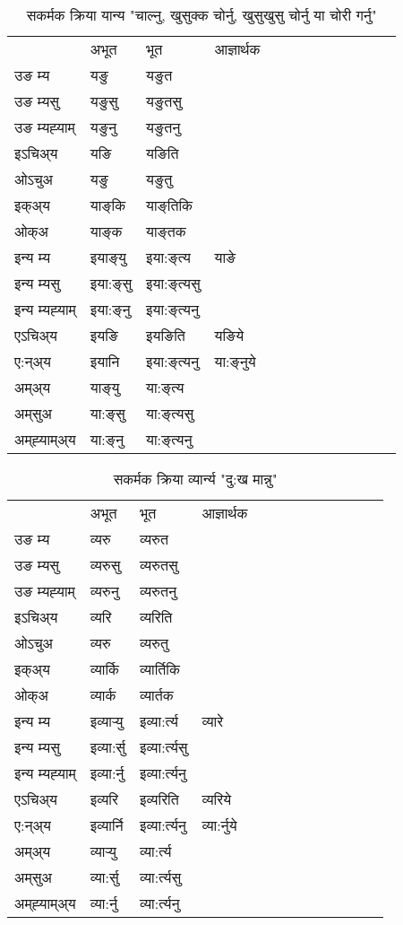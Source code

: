 \begin{table}[H]
\centering
\caption{\label{aŋ.vt} सकर्मक क्रिया  यान्य  "चाल्नु, खुसुक्क चोर्नु, खुसुखुसु चोर्नु या चोरी गर्नु"  }
\begin{tabular}{l|l|l|l|l|l|l|l|l|l|l|l|l}  \toprule
&अभूत & भूत & आज्ञार्थक \\ 
उङ म्य &यङु &यङुत \\ 
उङ म्यसु &यङुसु &यङुतसु \\ 
उङ म्यह्‍याम् &यङुनु &यङुतनु \\ 
इऽचिअ्य  &यङि &यङिति   \\ 
ओऽचुअ &यङु &यङुतु   \\ 
इक्अ्य &याङ्‌कि &याङ्‌तिकि   \\ 
ओक्अ &याङ्‌क &याङ्‌तक   \\ 
इन्य म्य& इयाङ्‌यु  & इया:ङ्‌त्य &याङे  \\ 
इन्य म्यसु & इया:ङ्‌सु  & इया:ङ्‌त्यसु   \\ 
इन्य म्यह्‍याम् & इया:ङ्‌नु  & इया:ङ्‌त्यनु   \\ 
एऽचिअ्य & इयङि & इयङिति &यङिये    \\ 
ए:न्अ्य & इयानि  & इया:ङ्‌त्यनु &या:ङ्‌नुये  \\ 
अम्अ्य & याङ्‌यु  & या:ङ्‌त्य  \\ 
अम्‌सुअ & या:ङ्‌सु & या:ङ्‌त्यसु  \\ 
अम्‌ह्‍याम्अ्य & या:ङ्‌नु  & या:ङ्‌त्यनु \\ 
\bottomrule
\end{tabular}
\end{table}


\begin{table}[H]
\centering
\caption{\label{ɛr.vt} सकर्मक क्रिया  व्यार्न्य  "दु:ख मान्नु"  }
\begin{tabular}{l|l|l|l|l|l|l|l|l|l|l|l|l}  \toprule
&अभूत & भूत & आज्ञार्थक \\ 
उङ म्य &व्यरु &व्यरुत \\ 
उङ म्यसु &व्यरुसु &व्यरुतसु \\ 
उङ म्यह्‍याम् &व्यरुनु &व्यरुतनु \\ 
इऽचिअ्य  &व्यरि &व्यरिति   \\ 
ओऽचुअ &व्यरु &व्यरुतु   \\ 
इक्अ्य &व्यार्कि &व्यार्तिकि   \\ 
ओक्अ &व्यार्क &व्यार्तक   \\ 
इन्य म्य& इव्यार्‍यु  & इव्या:र्त्य &व्यारे  \\ 
इन्य म्यसु & इव्या:र्सु  & इव्या:र्त्यसु   \\ 
इन्य म्यह्‍याम् & इव्या:र्नु  & इव्या:र्त्यनु   \\ 
एऽचिअ्य & इव्यरि & इव्यरिति &व्यरिये    \\ 
ए:न्अ्य & इव्यार्नि  & इव्या:र्त्यनु &व्या:र्नुये  \\ 
अम्अ्य & व्यार्‍यु  & व्या:र्त्य  \\ 
अम्‌सुअ & व्या:र्सु & व्या:र्त्यसु  \\ 
अम्‌ह्‍याम्अ्य & व्या:र्नु  & व्या:र्त्यनु \\ 
\bottomrule
\end{tabular}
\end{table}


